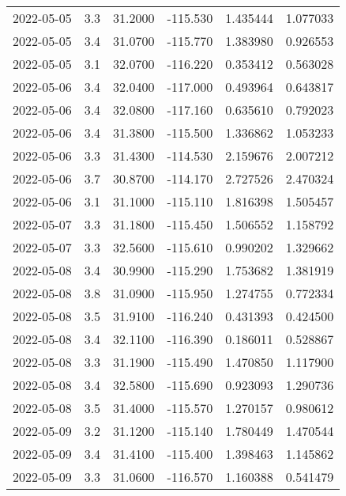 \begin{tabular}{lrrrrr}
2022-05-05 &       3.3 &  31.2000 &  -115.530 &         1.435444 &         1.077033 \\
2022-05-05 &       3.4 &  31.0700 &  -115.770 &         1.383980 &         0.926553 \\
2022-05-05 &       3.1 &  32.0700 &  -116.220 &         0.353412 &         0.563028 \\
2022-05-06 &       3.4 &  32.0400 &  -117.000 &         0.493964 &         0.643817 \\
2022-05-06 &       3.4 &  32.0800 &  -117.160 &         0.635610 &         0.792023 \\
2022-05-06 &       3.4 &  31.3800 &  -115.500 &         1.336862 &         1.053233 \\
2022-05-06 &       3.3 &  31.4300 &  -114.530 &         2.159676 &         2.007212 \\
2022-05-06 &       3.7 &  30.8700 &  -114.170 &         2.727526 &         2.470324 \\
2022-05-06 &       3.1 &  31.1000 &  -115.110 &         1.816398 &         1.505457 \\
2022-05-07 &       3.3 &  31.1800 &  -115.450 &         1.506552 &         1.158792 \\
2022-05-07 &       3.3 &  32.5600 &  -115.610 &         0.990202 &         1.329662 \\
2022-05-08 &       3.4 &  30.9900 &  -115.290 &         1.753682 &         1.381919 \\
2022-05-08 &       3.8 &  31.0900 &  -115.950 &         1.274755 &         0.772334 \\
2022-05-08 &       3.5 &  31.9100 &  -116.240 &         0.431393 &         0.424500 \\
2022-05-08 &       3.4 &  32.1100 &  -116.390 &         0.186011 &         0.528867 \\
2022-05-08 &       3.3 &  31.1900 &  -115.490 &         1.470850 &         1.117900 \\
2022-05-08 &       3.4 &  32.5800 &  -115.690 &         0.923093 &         1.290736 \\
2022-05-08 &       3.5 &  31.4000 &  -115.570 &         1.270157 &         0.980612 \\
2022-05-09 &       3.2 &  31.1200 &  -115.140 &         1.780449 &         1.470544 \\
2022-05-09 &       3.4 &  31.4100 &  -115.400 &         1.398463 &         1.145862 \\
2022-05-09 &       3.3 &  31.0600 &  -116.570 &         1.160388 &         0.541479 \\

\end{tabular}
